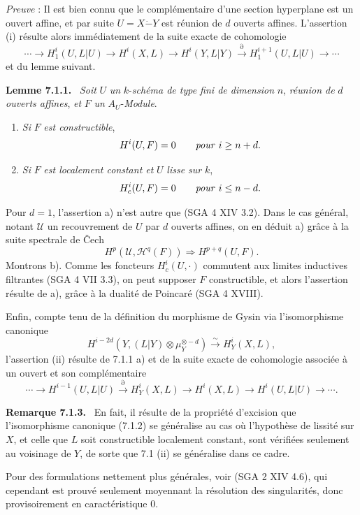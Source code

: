 \documentclass[11pt]{article}
\newenvironment{statement}[1]{\par\medskip\noindent\textbf{#1.}\ }{\par\medskip}
\begin{document}
\emph{Preuve} : Il est bien connu que le complémentaire d'une section hyperplane est un ouvert affine, et par suite $U=X\mathbin{\dot{-}}Y$ est réunion de $d$ ouverts affines. L'assertion (i) résulte alors immédiatement de la suite exacte de cohomologie
\[
\cdots\to H_1^i(U,L|U)\to H^i(X,L)\to H^i(Y,L|Y)
\xrightarrow{\partial} H_1^{i+1}(U,L|U)\to\cdots
\]
et du lemme suivant.

\begin{statement}{Lemme 7.1.1}
\emph{Soit} $U$ \emph{un} $k$-\emph{schéma de type fini de dimension} $n$, \emph{réunion de} $d$ \emph{ouverts affines}, \emph{et} $F$ \emph{un} $A_U$-\emph{Module}.
\begin{enumerate}[label=\alph*)]
\item \emph{Si} $F$ \emph{est constructible},
\[
H^i(U,F)=0\qquad\text{\emph{pour} }i\ge n+d.
\]
\item \emph{Si} $F$ \emph{est localement constant et} $U$ \emph{lisse sur} $k$,
\[
H^i_c(U,F)=0\qquad\text{\emph{pour} }i\le n-d.
\]
\end{enumerate}
\end{statement}

Pour $d=1$, l'assertion a) n'est autre que (SGA 4 XIV 3.2). Dans le cas général, notant $\mathcal U$ un recouvrement de $U$ par $d$ ouverts affines, on en déduit a) grâce à la suite spectrale de Čech
\[
H^p(\mathcal U,\mathcal H^q(F))\Rightarrow H^{p+q}(U,F).
\]
Montrons b). Comme les foncteurs $H_c^i(U,\cdot)$ commutent aux limites inductives filtrantes (SGA 4 VII 3.3), on peut supposer $F$ constructible, et alors l'assertion résulte de a), grâce à la dualité de Poincaré (SGA 4 XVIII).

Enfin, compte tenu de la définition du morphisme de Gysin via l'isomorphisme canonique
\[
H^{i-2d}(Y,(L|Y)\otimes\mu_Y^{\otimes -d})\xrightarrow{\sim} H^i_Y(X,L),
\tag{7.1.2}
\]
l'assertion (ii) résulte de 7.1.1 a) et de la suite exacte de cohomologie associée à un ouvert et son complémentaire
\[
\cdots\to H^{i-1}(U,L|U)\xrightarrow{\partial}H^i_Y(X,L)\to H^i(X,L)\to H^i(U,L|U)\to\cdots .
\]

\begin{statement}{Remarque 7.1.3}
En fait, il résulte de la propriété d'excision que l'isomorphisme canonique (7.1.2) se généralise au cas où l'hypothèse de lissité sur $X$, et celle que $L$ soit constructible localement constant, sont vérifiées seulement au voisinage de $Y$, de sorte que 7.1 (ii) se généralise dans ce cadre.

Pour des formulations nettement plus générales, voir (SGA 2 XIV 4.6), qui cependant est prouvé seulement moyennant la résolution des singularités, donc provisoirement en caractéristique $0$.
\end{statement}
\end{document}
